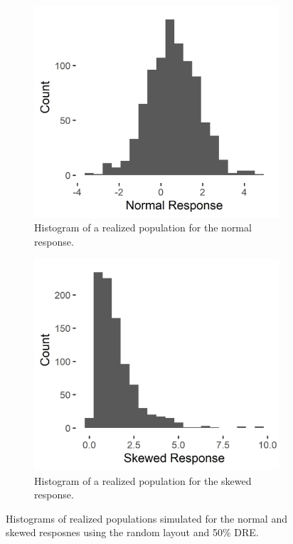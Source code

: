 \documentclass[]{elsarticle} %
\begin{document}
\begin{figure}
\centering
\begin{subfigure}{0.49\textwidth}
  \centering
  \includegraphics[width = 1\linewidth]{figures/symm_pop_hist.jpeg}
  \caption{Histogram of a realized population for the normal response.}
  \label{fig:symm_pop_hist}
\end{subfigure}
\begin{subfigure}{0.49\textwidth}
  \centering
  \includegraphics[width = 1\linewidth]{figures/skew_pop_hist.jpeg}
  \caption{Histogram of a realized population for the skewed response.}
  \label{fig:skew_pop_hist}
\end{subfigure}
\caption{Histograms of realized populations simulated for the normal and skewed resposnes using the random layout and 50\% DRE.}
\label{fig:sim_pops}
\end{figure}
\end{document}
